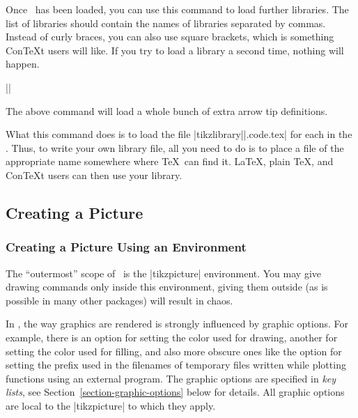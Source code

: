\begin{command}{\usetikzlibrary{}}
  Once \tikzname\ has been loaded, you can use this command to load
  further libraries. The list of libraries should contain the names of
  libraries separated by commas. Instead of curly braces, you can also
  use square brackets, which is something Con\TeX t users will
  like. If you try to load a library a second time, nothing will
  happen. 

  \example |\usetikzlibrary{arrows}|

  The above command will load a whole bunch of extra arrow tip
  definitions.

  What this command does is to load the file
  |tikzlibrary||.code.tex| for each  in
  the . Thus, to write your own library file,
  all you need to do is to place a file of the appropriate name
  somewhere where \TeX\ can find it. \LaTeX, plain \TeX, and Con\TeX t
  users can then use your library.
\end{command}



\subsection{Creating a Picture}

\subsubsection{Creating a Picture Using an Environment}

The ``outermost'' scope of \tikzname\ is the |{tikzpicture}| 
environment. You may give drawing commands only inside this
environment, giving them outside (as is possible in many other
packages) will result in chaos.

In \tikzname, the way graphics are rendered is strongly influenced by
graphic options. For example, there is an option for setting the color used
for drawing, another for setting the color used for filling, and also
more obscure ones like the option  for setting the prefix used in the
filenames of temporary files written while plotting functions using an
external program. The graphic options are specified in \emph{key
  lists}, see Section~\ref{section-graphic-options} below for
details. All graphic options are local to the |{tikzpicture}| to which
they apply.  

